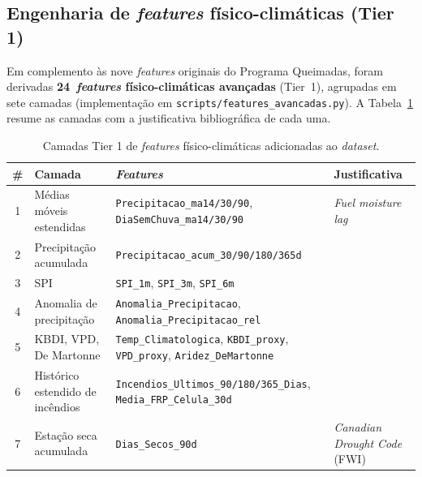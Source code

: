 
\subsection{Engenharia de \emph{features} físico-climáticas (Tier 1)}
\label{subsec:metod_features_tier1}

Em complemento às nove \emph{features} originais do Programa Queimadas, foram derivadas \textbf{24~\emph{features} físico-climáticas avançadas} (Tier~1), agrupadas em sete camadas (implementação em \texttt{scripts/features\_avancadas.py}). A Tabela~\ref{tab:metod_tier1} resume as camadas com a justificativa bibliográfica de cada uma.

\begin{table}[h]
\centering
\caption{Camadas Tier 1 de \emph{features} físico-climáticas adicionadas ao \emph{dataset}.}
\label{tab:metod_tier1}
\small
\begin{tabular}{clp{6cm}l}
\toprule
\textbf{\#} & \textbf{Camada} & \textbf{\emph{Features}} & \textbf{Justificativa} \\
\midrule
1 & Médias móveis estendidas & \texttt{Precipitacao\_ma14/30/90}, \texttt{DiaSemChuva\_ma14/30/90} & \emph{Fuel moisture lag}~\cite{seager2015climatology} \\
2 & Precipitação acumulada & \texttt{Precipitacao\_acum\_30/90/180/365d} & \cite{seager2015climatology} \\
3 & SPI & \texttt{SPI\_1m}, \texttt{SPI\_3m}, \texttt{SPI\_6m} & \cite{mckee1993spi,npjhazards2025fire} \\
4 & Anomalia de precipitação & \texttt{Anomalia\_Precipitacao}, \texttt{Anomalia\_Precipitacao\_rel} & \cite{forests2024cerradoamazon} \\
5 & KBDI, VPD, De Martonne & \texttt{Temp\_Climatologica}, \texttt{KBDI\_proxy}, \texttt{VPD\_proxy}, \texttt{Aridez\_DeMartonne} & \cite{keetch1968drought,seager2015climatology,demartonne1926aridity,forests2024cerradoamazon} \\
6 & Histórico estendido de incêndios & \texttt{Incendios\_Ultimos\_90/180/365\_Dias}, \texttt{Media\_FRP\_Celula\_30d} & \cite{cheerala2025probabilistic} \\
7 & Estação seca acumulada & \texttt{Dias\_Secos\_90d} & \emph{Canadian Drought Code} (FWI) \\
\bottomrule
\end{tabular}
\end{table}

